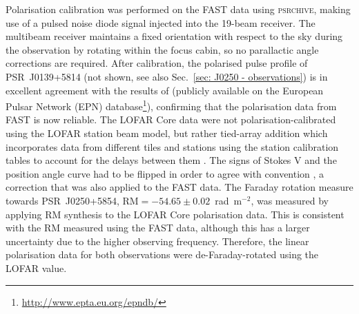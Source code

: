 Polarisation calibration was performed on the FAST data using \textsc{psrchive}, making use of a pulsed noise diode signal injected into the 19-beam receiver. The multibeam receiver maintains a fixed orientation with respect to the sky during the observation by rotating within the focus cabin, so no parallactic angle corrections are required. After calibration, the polarised pulse profile of PSR~J0139+5814 (not shown, see also Sec.~\ref{sec: J0250 - observations}) is in excellent agreement with the results of \citet{GLxx1998} (publicly available on the European Pulsar Network (EPN) database\footnote{\url{http://www.epta.eu.org/epndb/}}), confirming that the polarisation data from FAST is now reliable. The LOFAR Core data were not polarisation-calibrated using the LOFAR station beam model, but rather tied-array addition which incorporates data from different tiles and stations using the station calibration tables to account for the delays between them \citep[more detail can be found in ][]{SBG+2019}. The signs of Stokes V and the position angle curve had to be flipped in order to agree with convention \citep[e.g.][see also Sec.~\ref{sec: intro - emission models - polarisation - conventions}]{EWxx2001}, a correction that was also applied to the FAST data. The Faraday rotation measure towards PSR~J0250+5854, $\mathrm{RM}=-54.65\pm0.02$~rad~m$^{-2}$, was measured by applying RM synthesis \citep{BBxx2005} to the LOFAR Core polarisation data. This is consistent with the RM measured using the FAST data, although this has a larger uncertainty due to the higher observing frequency. Therefore, the linear polarisation data for both observations were de-Faraday-rotated using the LOFAR value.

